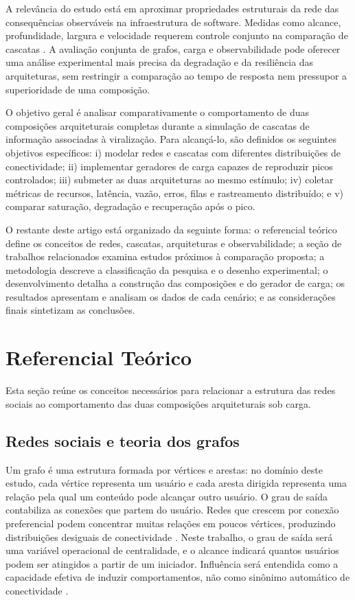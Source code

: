 A relevância do estudo está em aproximar propriedades estruturais da rede das consequências observáveis na infraestrutura de software. Medidas como alcance, profundidade, largura e velocidade requerem controle conjunto na comparação de cascatas \cite{juul2021}. A avaliação conjunta de grafos, carga e observabilidade pode oferecer uma análise experimental mais precisa da degradação e da resiliência das arquiteturas, sem restringir a comparação ao tempo de resposta nem pressupor a superioridade de uma composição.

O objetivo geral é analisar comparativamente o comportamento de duas composições arquiteturais completas durante a simulação de cascatas de informação associadas à viralização. Para alcançá-lo, são definidos os seguintes objetivos específicos: i) modelar redes e cascatas com diferentes distribuições de conectividade; ii) implementar geradores de carga capazes de reproduzir picos controlados; iii) submeter as duas arquiteturas ao mesmo estímulo; iv) coletar métricas de recursos, latência, vazão, erros, filas e rastreamento distribuído; e v) comparar saturação, degradação e recuperação após o pico.

O restante deste artigo está organizado da seguinte forma: o referencial teórico define os conceitos de redes, cascatas, arquiteturas e observabilidade; a seção de trabalhos relacionados examina estudos próximos à comparação proposta; a metodologia descreve a classificação da pesquisa e o desenho experimental; o desenvolvimento detalha a construção das composições e do gerador de carga; os resultados apresentam e analisam os dados de cada cenário; e as considerações finais sintetizam as conclusões.

\estrutura\section{\esp Referencial Teórico}

Esta seção reúne os conceitos necessários para relacionar a estrutura das redes sociais ao comportamento das duas composições arquiteturais sob carga.

\estrutura\subsection{\esp Redes sociais e teoria dos grafos}

Um grafo é uma estrutura formada por vértices e arestas: no domínio deste estudo, cada vértice representa um usuário e cada aresta dirigida representa uma relação pela qual um conteúdo pode alcançar outro usuário. O grau de saída contabiliza as conexões que partem do usuário. Redes que crescem por conexão preferencial podem concentrar muitas relações em poucos vértices, produzindo distribuições desiguais de conectividade \cite{piva2021}. Neste trabalho, o grau de saída será uma variável operacional de centralidade, e o alcance indicará quantos usuários podem ser atingidos a partir de um iniciador. Influência será entendida como a capacidade efetiva de induzir comportamentos, não como sinônimo automático de conectividade \cite{zareie2023}.


